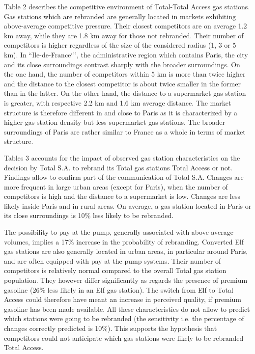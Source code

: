 \documentclass[english]{article}
\begin{document}
Table 2 describes the competitive environment of Total-Total Access gas stations. Gas stations which are rebranded are generally located in markets exhibiting above-average competitive pressure. Their closest competitors are on average 1.2 km away, while they are 1.8 km away for those not rebranded. Their number of competitors is higher regardless of the size of the considered radius (1, 3 or 5 km). In ``Ile-de-France`'', the administrative region which contains Paris, the city and its close surroundings contrast sharply with the broader surroundings. On the one hand, the number of competitors within 5 km is more than twice higher and the distance to the closest competitor is about twice smaller in the former than in the latter. On the other hand, the distance to a supermarket gas station is greater, with respective 2.2 km and 1.6 km average distance. The market structure is therefore different in and close to Paris as it is characterized by a higher gas station density but less supermarket gas stations. The broader surroundings of Paris are rather similar to France as a whole in terms of market structure. 

Tables 3 accounts for the impact of observed gas station characteristics on the decision by Total S.A. to rebrand its Total gas stations Total Access or not. Findings allow to confirm part of the communication of Total S.A. Changes are more frequent in large urban areas (except for Paris), when the number of competitors is high and the distance to a supermarket is low. Changes are less likely inside Paris and in rural areas. On average, a gas station located in Paris or its close surroundings is 10\% less likely to be rebranded.

The possibility to pay at the pump, generally associated with above average volumes, implies a 17\% increase in the probability of rebranding. Converted Elf gas stations are also generally located in urban areas, in particular around Paris, and are often equipped with pay at the pump systems. Their number of competitors is relatively normal compared to the overall Total gas station population. They however differ significantly as regards the presence of premium gasoline (26\% less likely in an Elf gas station). The switch from Elf to Total Access could therefore have meant an increase in perceived quality, if premium gasoline has been made available. All these characteristics do not allow to predict which stations were going to be rebranded (the sensitivity i.e. the percentage of changes correctly predicted is 10\%). This supports the hypothesis that competitors could not anticipate which gas stations were likely to be rebranded Total Access.
\end{document}
